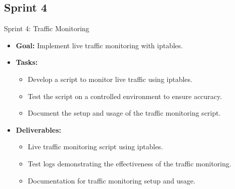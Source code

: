\documentclass[11pt,a4paper]{article}
\begin{document}
    \subsection{Sprint 4}\label{subsec:sprint-4}
    \begin{frame}{Sprint 4: Traffic Monitoring}
        \begin{itemize}
            \item \textbf{Goal:} Implement live traffic monitoring with iptables.
            \item \textbf{Tasks:}
            \begin{itemize}
                \item Develop a script to monitor live traffic using iptables.
                \item Test the script on a controlled environment to ensure accuracy.
                \item Document the setup and usage of the traffic monitoring script.
            \end{itemize}
            \item \textbf{Deliverables:}
            \begin{itemize}
                \item Live traffic monitoring script using iptables.
                \item Test logs demonstrating the effectiveness of the traffic monitoring.
                \item Documentation for traffic monitoring setup and usage.
            \end{itemize}
        \end{itemize}
    \end{frame}
\end{document}
